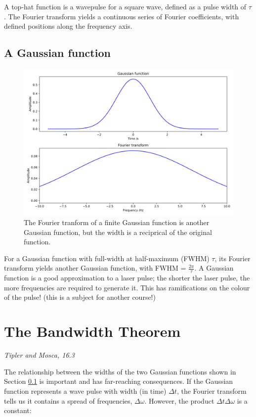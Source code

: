 \documentclass[
]{book}
\begin{document}
A top-hat function is a wavepulse for a square wave, defined as a pulse width of \(\tau\). The Fourier transform yields a continuous series of Fourier coefficients, with defined positions along the frequency axis.

\hypertarget{sec-ch11-ftgaussian}{%
\subsection{A Gaussian function}\label{sec-ch11-ftgaussian}}

\begin{figure}

{\centering \includegraphics[width=0.7\linewidth]{visualisations/ch11-ftgaussian1} 

}

\caption{The Fourier tranform of a finite Gaussian function is another Gaussian function, but the width is a reciprical of the original function.}\label{fig:ch11-ftgaussian1}
\end{figure}

For a Gaussian function with full-width at half-maximum (FWHM) \(\tau\), its Fourier transform yields another Gaussian function, with FWHM = \(\frac{2\pi}{\tau}\). A Gaussian function is a good approximation to a laser pulse; the shorter the laser pulse, the more frequencies are required to generate it. This has ramifications on the colour of the pulse! (this is a subject for another course!)

\hypertarget{sec-ch11-bandwidththeorem}{%
\section{The Bandwidth Theorem}\label{sec-ch11-bandwidththeorem}}

\emph{Tipler and Mosca, 16.3}

The relationship between the widths of the two Gaussian functions shown in Section \ref{sec-ch11-ftgaussian} is important and has far-reaching consequences. If the Gaussian function represents a wave pulse with width (in time) \(\Delta t\), the Fourier transform tells us it contains a spread of frequencies, \(\Delta \omega\). However, the product \(\Delta t \Delta \omega\) is a constant:
\end{document}
